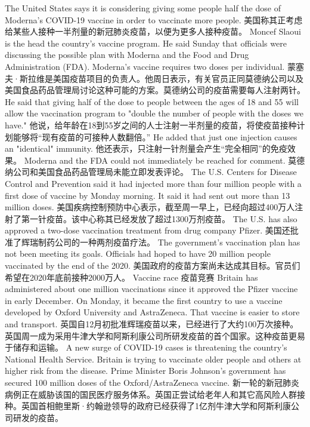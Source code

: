 The United States says it is considering giving some people half the dose of Moderna's COVID-19 vaccine in order to vaccinate more people.
美国称其正考虑给某些人接种一半剂量的新冠肺炎疫苗，以便为更多人接种疫苗。
Moncef Slaoui is the head the country's vaccine program. He said Sunday that officials were discussing the possible plan with Moderna and the Food and Drug Administration (FDA). Moderna's vaccine requires two doses per individual.
蒙塞夫·斯拉维是美国疫苗项目的负责人。他周日表示，有关官员正同莫德纳公司以及美国食品药品管理局讨论这种可能的方案。莫德纳公司的疫苗需要每人注射两针。
He said that giving half of the dose to people between the ages of 18 and 55 will allow the vaccination program to "double the number of people with the doses we have."
他说，给年龄在18到55岁之间的人士注射一半剂量的疫苗，将使疫苗接种计划能够将“现有疫苗的可接种人数翻倍。”
He added that just one injection causes an "identical" immunity.
他还表示，只注射一针剂量会产生“完全相同”的免疫效果。
Moderna and the FDA could not immediately be reached for comment.
莫德纳公司和美国食品药品管理局未能立即发表评论。
The U.S. Centers for Disease Control and Prevention said it had injected more than four million people with a first dose of vaccine by Monday morning. It said it had sent out more than 13 million doses.
美国疾病控制预防中心表示，截至周一早上，已经向超过400万人注射了第一针疫苗。该中心称其已经发放了超过1300万剂疫苗。
The U.S. has also approved a two-dose vaccination treatment from drug company Pfizer.
美国还批准了辉瑞制药公司的一种两剂疫苗疗法。
The government's vaccination plan has not been meeting its goals. Officials had hoped to have 20 million people vaccinated by the end of the 2020.
美国政府的疫苗方案尚未达成其目标。官员们希望在2020年底前接种2000万人。
Vaccine race
疫苗竞赛
Britain has administered about one million vaccinations since it approved the Pfizer vaccine in early December. On Monday, it became the first country to use a vaccine developed by Oxford University and AstraZeneca. That vaccine is easier to store and transport.
英国自12月初批准辉瑞疫苗以来，已经进行了大约100万次接种。英国周一成为采用牛津大学和阿斯利康公司所研发疫苗的首个国家。这种疫苗更易于储存和运输。
A new surge of COVID-19 cases is threatening the country's National Health Service. Britain is trying to vaccinate older people and others at higher risk from the disease. Prime Minister Boris Johnson's government has secured 100 million doses of the Oxford/AstraZeneca vaccine.
新一轮的新冠肺炎病例正在威胁该国的国民医疗服务体系。英国正尝试给老年人和其它高风险人群接种。英国首相鲍里斯·约翰逊领导的政府已经获得了1亿剂牛津大学和阿斯利康公司研发的疫苗。
